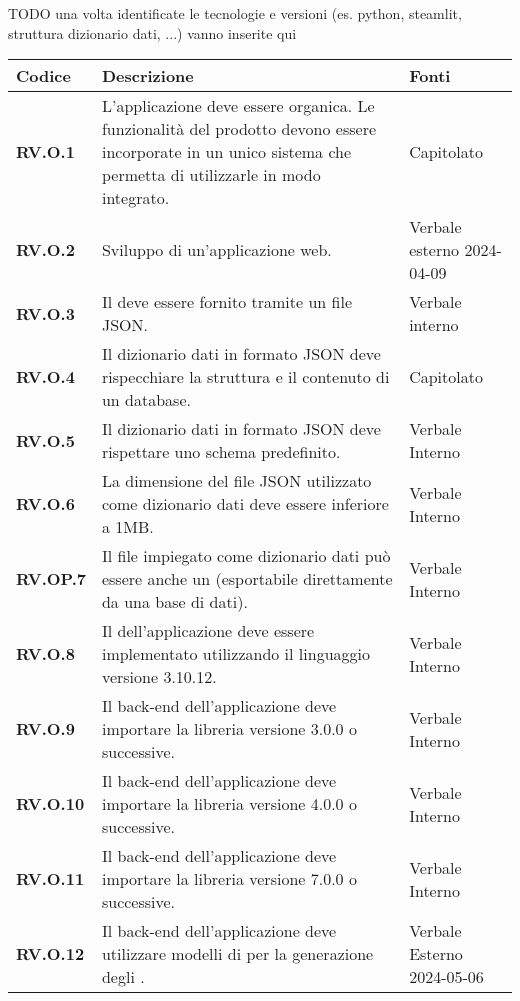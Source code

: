 TODO una volta identificate le tecnologie e versioni (es. python, steamlit, struttura dizionario dati, ...) vanno inserite qui
\begin{longtable}{|P{3cm}|P{6,5cm}|>{\arraybackslash}P{4cm}|}
  \hline
  \textbf{Codice} & \textbf{Descrizione} & \textbf{Fonti} \\
  \hline
  \textbf{RV.O.1} & L'applicazione deve essere organica. Le funzionalità del prodotto devono essere incorporate in un unico sistema che permetta di utilizzarle in modo integrato. & Capitolato \\
  \hline
  \textbf{RV.O.2} & Sviluppo di un'applicazione web. & Verbale esterno 2024-04-09 \\
  \hline
  \textbf{RV.O.3} & Il  deve essere fornito tramite un file JSON. & Verbale interno \\
  \hline
  \textbf{RV.O.4} & Il dizionario dati in formato JSON deve rispecchiare la struttura e il contenuto di un database. & Capitolato \\
  \hline
  \textbf{RV.O.5} & Il dizionario dati in formato JSON deve rispettare uno schema predefinito. & Verbale Interno \\
  \hline
  \textbf{RV.O.6} & La dimensione del file JSON utilizzato come dizionario dati deve essere inferiore a 1MB. & Verbale Interno \\
  \hline
  \textbf{RV.OP.7} & Il file impiegato come dizionario dati può essere anche un  (esportabile direttamente da una base di dati). & Verbale Interno \\
  \hline
  \textbf{RV.O.8} & Il  dell'applicazione deve essere implementato utilizzando il linguaggio  versione 3.10.12. & Verbale Interno \\
  \hline
  \textbf{RV.O.9} & Il back-end dell'applicazione deve importare la libreria  versione 3.0.0 o successive. & Verbale Interno \\
  \hline
  \textbf{RV.O.10} & Il back-end dell'applicazione deve importare la libreria  versione 4.0.0 o successive. & Verbale Interno \\
  \hline
  \textbf{RV.O.11} & Il back-end dell'applicazione deve importare la libreria  versione 7.0.0 o successive. & Verbale Interno \\
  \hline
  \textbf{RV.O.12} & Il back-end dell'applicazione deve utilizzare modelli di  per la generazione degli . & Verbale Esterno 2024-05-06 \\

\end{longtable}
